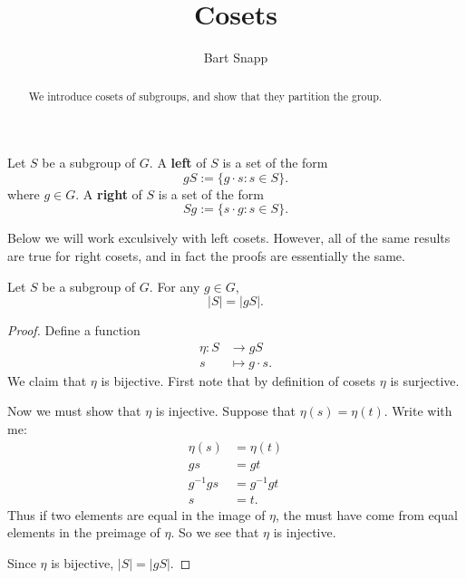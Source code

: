 \documentclass{ximera}
\author{Bart Snapp}
\title{Cosets}
\begin{document}
\begin{abstract}
We introduce cosets of subgroups, and show that they partition the
group.
\end{abstract}
\maketitle


\begin{definition}
  Let $S$ be a subgroup of $G$. A \textbf{left } of $S$ is a set of
  the form
  \[
  gS := \{g\cdot s : s\in S\}.
  \]
  where $g\in G$. A \textbf{right } of $S$ is a set of the form
  \[
  Sg := \{s\cdot g : s\in S\}.
  \]
\end{definition}

\begin{remark}
  Below we will work exculsively with left cosets. However, all of the
  same results are true for right cosets, and in fact the proofs are
  essentially the same.
\end{remark}



\begin{proposition}\label{P:CSG}
  Let $S$ be a subgroup of $G$. For any $g\in G$,
  \[
  |S| = |gS|.
  \]
  \begin{proof}
    Define a function
    \begin{align*}
      \eta: S &\to g S\\
      s &\mapsto g\cdot s.
    \end{align*}
    We claim that $\eta$ is bijective. First note that by definition
    of cosets $\eta$ is surjective.

    Now we must show that $\eta$ is injective. Suppose that $\eta(s) =
    \eta(t)$. Write with me:
    \begin{align*}
      \eta(s) &= \eta(t) \\
      gs &= gt\\
      g^{-1} g s &= g^{-1} g t\\
      s &= t.
    \end{align*}
    Thus if two elements are equal in the image of $\eta$, the must
    have come from equal elements in the preimage of $\eta$. So we see
    that $\eta$ is injective.

    Since $\eta$ is bijective, $|S|= |gS|$.
  \end{proof}
\end{proposition}
\end{document}
